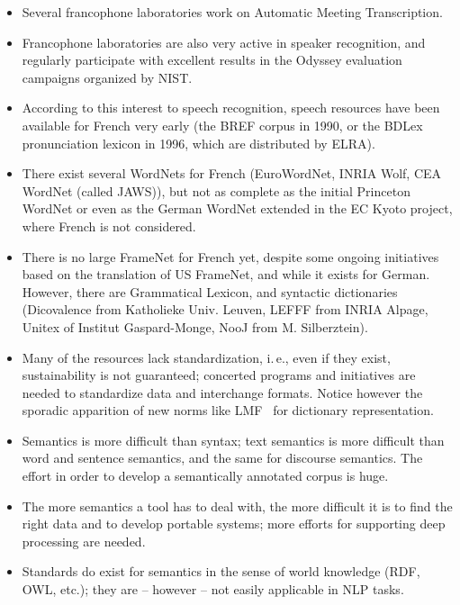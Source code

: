 \begin{multicols}{2}
\begin{itemize}
\item Several francophone laboratories work on Automatic Meeting Transcription.

\item Francophone laboratories are also very active in speaker recognition, and regularly
participate with excellent results in the Odyssey evaluation
campaigns organized by NIST.

\item According to this interest to speech recognition, speech resources
have been available for French very early (the BREF corpus in 1990, or
the BDLex pronunciation lexicon in 1996, which are distributed by
ELRA).

\item There exist several WordNets for French (EuroWordNet, INRIA Wolf, CEA
WordNet (called JAWS)), but not as complete as the initial Princeton
WordNet or even as the German WordNet extended in the EC Kyoto
project, where French is not considered.

\item There is no large FrameNet for French yet, despite some ongoing
initiatives based on the translation of US FrameNet, and while it
exists for German. However, there are Grammatical Lexicon, and
syntactic dictionaries (Dicovalence from Katholieke Univ. Leuven,
LEFFF from INRIA Alpage, Unitex of Institut Gaspard-Monge, NooJ from M. Silberztein).

\item Many of the resources lack standardization, i.\,e., even if they
  exist, sustainability is not guaranteed; concerted programs and
  initiatives are needed to standardize data and interchange
  formats. Notice however the sporadic apparition of new norms like
  LMF~\cite{LMF} for dictionary representation.

\item Semantics is more difficult than syntax; text semantics is more
difficult than word and sentence semantics, and the same for discourse
semantics. The effort in order to develop a semantically annotated
corpus is huge.

\item The more semantics a tool has to deal with, the more difficult it is
to find the right data and to develop portable systems; more efforts
for supporting deep processing are needed.

\item Standards do exist for semantics in the sense of world knowledge (RDF,
OWL, etc.); they are – however – not easily applicable in NLP tasks.


\end{itemize}
\end{multicols}
